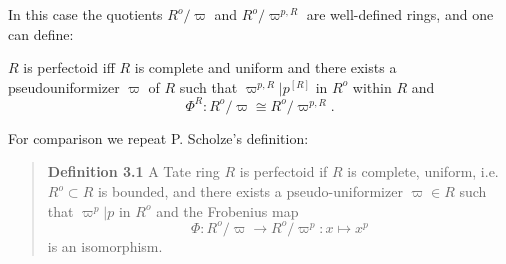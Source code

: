 \documentclass[english,11pt]{article}
\begin{document}
In this case the quotients $R^o/\varpi$ and $R^o/\varpi^{p,R}$ are well-defined
rings, and one can define:
\begin{forthel}
\begin{definition}
$R$ is perfectoid iff $R$ is complete and uniform and there
exists a pseudouniformizer $\varpi$ of $R$ such that    
$\varpi^{p,R} | p^{[R]}$ in $R^o$ within $R$
and 
\[\Phi^{R} : R^o / \varpi \cong R^o / \varpi^{p,R}.\]
\end{definition}

\end{forthel}

For comparison we repeat P. Scholze's definition:

\begin{quote}
\textbf{Definition 3.1} A Tate ring $R$ is perfectoid if $R$ is complete, uniform,
i.e. $R^o \subset R$ is bounded, and there exists a
pseudo-uniformizer $\varpi \in R$ such that $\varpi^p | p$ in $R^o$ and the
Frobenius map
\[\Phi: R^o/\varpi \rightarrow R^o/\varpi^p : x \mapsto x^p\]
is an isomorphism.
\end{quote}

\printbibliography
\end{document}

